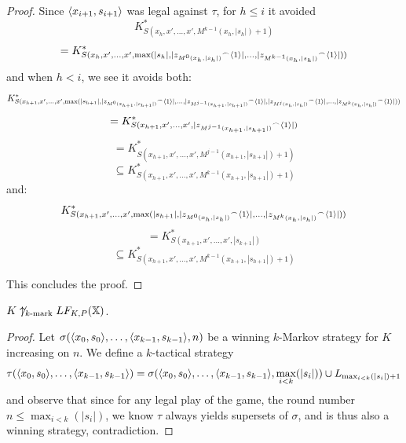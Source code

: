 \begin{proof}
Since $\langle x_{i+1},s_{i+1}\rangle$ was legal against $\tau$, for $h\leq i$ it avoided
  \[
    K^*_{S(x_h,x',\dots,x',M^{k-1}(x_h,|s_h|)+1)} 
  \]
  \[
    = 
    K^*_{S(x_h,x',\dots,x',\max(|s_h|,|{z_{M^{0}(x_h,|s_h|)}}^\frown\langle1\rangle|,\dots,|{z_{M^{k-1}(x_h,|s_h|)}}^\frown\langle1\rangle|))}
  \]
and when $h<i$, we see it avoids both:
  \[
    K^*_{S(x_{h+1},x',\dots,x',\max(|s_{h+1}|,|{z_{M^0(x_{h+1},|s_{h+1}|)}}^\frown\langle1\rangle|,\dots,|{z_{M^{j-1}(x_{h+1},|s_{h+1}|)}}^\frown\langle1\rangle|,|{z_{M^{j}(x_{h},|s_{h}|)}}^\frown\langle1\rangle|,\dots,|{z_{M^{k}(x_{h},|s_{h}|)}}^\frown\langle1\rangle|))} 
  \]
  \[
    =
    K^*_{S(x_{h+1},x',\dots,x',|{z_{M^{j-1}(x_{h+1},|s_{h+1}|)}}^\frown\langle1\rangle|)}
  \]
  \[
    =
    K^*_{S(x_{h+1},x',\dots,x',M^{j-1}(x_{h+1},|s_{h+1}|)+1)}
  \]
  \[
    \subseteq
    K^*_{S(x_{h+1},x',\dots,x',M^{k-1}(x_{h+1},|s_{h+1}|)+1)}
  \]
and:
  \[
    K^*_{S(x_{h+1},x',\dots,x',\max(|s_{h+1}|,|{z_{M^0(x_{h},|s_{h}|)}}^\frown\langle1\rangle|,\dots,|{z_{M^{k}(x_{h},|s_{h}|)}}^\frown\langle1\rangle|))} 
  \]
  \[
    =
    K^*_{S(x_{h+1},x',\dots,x',|s_{k+1}|)}
  \]
  \[
    \subseteq
    K^*_{S(x_{h+1},x',\dots,x',M^{k-1}(x_{h+1},|s_{h+1}|)+1)}
  \]


This concludes the proof.
\end{proof}

\begin{corollary}
$K\not\uparrow_{k\text{-mark}}LF_{K,P}(\mathbb{X})$.
\end{corollary}

\begin{proof}
Let $\sigma(\langle x_0,s_0\rangle,\dots,\langle x_{k-1},s_{k-1}\rangle,n)$ be a winning $k$-Markov strategy for $K$ increasing on $n$. We define a $k$-tactical strategy
  \[
    \tau(\langle x_0,s_0\rangle,\dots,\langle x_{k-1},s_{k-1}\rangle) = \sigma(\langle x_0,s_0\rangle,\dots,\langle x_{k-1},s_{k-1}\rangle,\max_{i<k}(|s_i|)) \cup L_{\max_{i<k}(|s_i|)+1}
  \]
and observe that since for any legal play of the game, the round number $n \leq \max_{i<k}(|s_i|)$, we know $\tau$ always yields supersets of $\sigma$, and is thus also a winning strategy, contradiction.
\end{proof}

